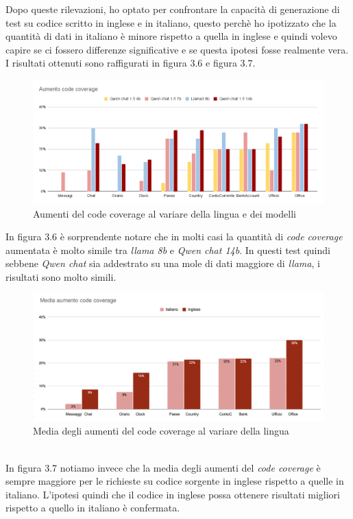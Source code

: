  \newpage   Dopo queste rilevazioni, ho optato per confrontare la capacità di generazione di test su codice scritto in inglese e in italiano, questo perchè ho ipotizzato che
    la quantità di dati in italiano è minore rispetto a quella in inglese e quindi volevo capire se ci fossero differenze significative e se questa ipotesi fosse realmente vera.
    I risultati ottenuti sono raffigurati in figura 3.6 e figura 3.7.
    \begin{figure}[!h]
        \centering        
        \includegraphics[width=14.5cm]{img/Aumento code coverage.png}
        \caption{Aumenti del code coverage al variare della lingua e dei modelli}
    \end{figure}
   \newline In figura 3.6  è sorprendente notare che in molti casi la quantità di \textit{code coverage} aumentata è molto simile tra \textit{llama 8b} e \textit{Qwen chat 14b}.
    In questi test quindi sebbene \textit{Qwen chat} sia addestrato su una mole di dati maggiore di \textit{llama}, i risultati sono molto simili.
    \begin{figure}[!h]
        \centering        
        \includegraphics[width=14.5cm]{img/Media aumento code coverage.png}
        \caption{Media degli aumenti del code coverage al variare della lingua}
    \end{figure}
    \\In figura 3.7 notiamo invece che la media degli aumenti del \textit{code coverage} è sempre maggiore per le richieste su codice sorgente in inglese rispetto a quelle in italiano.
    L'ipotesi quindi che il codice in inglese possa ottenere risultati migliori rispetto a quello in italiano è confermata.
    \newpage
